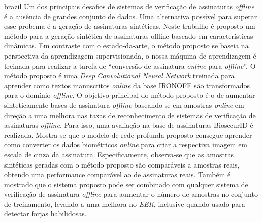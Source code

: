 \begin{resumo}[Resumo]
 \begin{otherlanguage*}{brazil}
  Um dos principais desafios de sistemas de verificação de assinaturas \textit{offline} é a ausência de grandes conjunto de dados. Uma alternativa possível para superar esse probema é a geração de assinaturas sintéticas. Neste trabalho é proposto um método para a geração sintética de assinaturas offline baseado em características dinâmicas. Em contraste com o estado-da-arte, o método  proposto se baseia na perspectiva da aprendizagem supervisionada, o nossa máquina de aprendizagem é treinada para realizar a tarefa de ``conversão de assinatura \textit{online} para \textit{offline}''. O método proposto é uma \textit{Deep Convolutional Neural Network} treinada para aprender como textos manuscritos \textit{online} da base IRONOFF são transformados para o domínio \textit{offline}. O objetivo principal do método proposto é o de aumentar sinteticamente bases de assinatura \textit{offline} baseando-se em amostras \textit{online} em direção a uma melhora nas taxas de reconhecimento de sistemas de verificação de assinaturas \textit{offline}. Para isso, uma avaliação na base de assinaturas BiosecurID é realizada. Mostra-se que o modelo de rede profunda proposto consegue aprender como converter os dados biométricos \textit{online} para criar a respectiva imagem em escala de cinza da assinatura. Especificamente, observa-se que as amostras sintéticas geradas com o método proposto são comparáveis a amostras reais, obtendo uma performance comparável ao de assinaturas reais. Também é mostrado que o sistema proposto pode ser combinado com qualquer sistema de verificação de assinatura \textit{offline} para aumentar o número de amostras no conjunto de treinamento, levando a uma melhora no \textit{EER}, inclusive quando usado para detectar forjas habilidosas.
  
   \vspace{\onelineskip}
 
   \noindent 
 \end{otherlanguage*}
\end{resumo}


